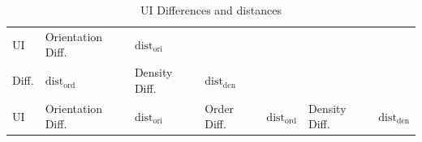 \hypertarget{tbl:ci:distances}{}
\begin{longtable}[]{@{}lllllll@{}}
\caption{\label{tbl:ci:distances}UI Differences and distances}\tabularnewline
\toprule
\begin{minipage}[b]{0.12\columnwidth}\raggedright
UI\strut
\end{minipage} & \begin{minipage}[b]{0.14\columnwidth}\raggedright
Orientation Diff.\strut
\end{minipage} & \begin{minipage}[b]{0.08\columnwidth}\raggedright
\(\text{dist}_{\text{ori}}\)\strut
\end{minipage} & \begin{minipage}[b]{0.14\columnwidth}\raggedright
Order\\Diff.\strut
\end{minipage} & \begin{minipage}[b]{0.08\columnwidth}\raggedright
\(\text{dist}_{\text{ord}}\)\strut
\end{minipage} & \begin{minipage}[b]{0.14\columnwidth}\raggedright
Density Diff.\strut
\end{minipage} & \begin{minipage}[b]{0.08\columnwidth}\raggedright
\(\text{dist}_{\text{den}}\)\strut
\end{minipage}\tabularnewline
\midrule
\endfirsthead
\toprule
\begin{minipage}[b]{0.12\columnwidth}\raggedright
UI\strut
\end{minipage} & \begin{minipage}[b]{0.14\columnwidth}\raggedright
Orientation Diff.\strut
\end{minipage} & \begin{minipage}[b]{0.08\columnwidth}\raggedright
\(\text{dist}_{\text{ori}}\)\strut
\end{minipage} & \begin{minipage}[b]{0.14\columnwidth}\raggedright
Order Diff.\strut
\end{minipage} & \begin{minipage}[b]{0.08\columnwidth}\raggedright
\(\text{dist}_{\text{ord}}\)\strut
\end{minipage} & \begin{minipage}[b]{0.14\columnwidth}\raggedright
Density Diff.\strut
\end{minipage} & \begin{minipage}[b]{0.08\columnwidth}\raggedright
\(\text{dist}_{\text{den}}\)\strut

\end{minipage}
\end{longtable}
